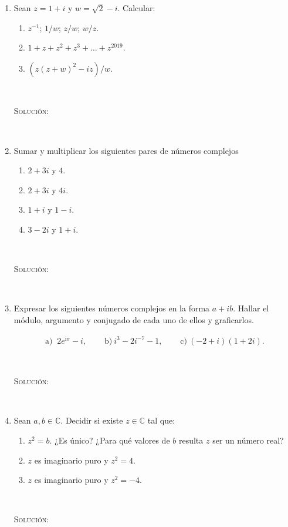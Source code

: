\documentclass[a4paper,12pt,twoside,spanish,reqno]{amsbook}
\numberwithin{equation}{section}
\newcommand{\rta}{\noindent\textsc{Solución: }}
\begin{document}
\begin{enumerate}
\vspace{.5cm}


\item Sean $z=1+i$ y $w=\sqrt{2}-i$. Calcular:
 \begin{enumerate}
  \item $z^{-1}$; $1/w$; $z/w$; $w/z$.

  \item $1+z+z^2+z^3+\dots+z^{2019}$.

  \item $(z(z+w)^2-iz)/w$.
 \end{enumerate}
	
 \ 

 \rta 
 
 \  

\vspace{.5cm}


\item Sumar y multiplicar los siguientes pares de números complejos
    \begin{enumerate}
        \item $2+ 3i$ y $4$.
        \item $2+ 3i$ y $4i$.
        \item $1 + i$ y $ 1 -i$.
        \item $3-2i$ y $1 +i$. 
    \end{enumerate}

\ 

\rta 

\ 

\vspace{.5cm}


 \item Expresar los siguientes n{ú}meros complejos en la forma $a +i b$.
 Hallar el módulo, argumento y conjugado de cada uno de ellos y graficarlos.

 $$\begin{array}{lll}
 \text{a) }\ 2e^{\mathrm{i}\pi}-i,  \quad & \text{ b)} \  i^3 - 2i^{-7} -1, \quad &\text{ c)}\ (-2+i) (1+2i).
  \end{array}$$
	
  \ 

  \rta 
  
  \ 
    
\vspace{.5cm}

\item Sean $a,b\in\mathbb{C}$. Decidir si existe $z \in \mathbb{C}$ tal que:
\begin{enumerate}
  \item $z^2=b$. ¿Es único? ¿Para qué valores de $b$ resulta $z$ ser un número real?
  \item $z$ es imaginario puro y $z^2=4$.
  \item $z$ es imaginario puro y $z^2=-4$.
\end{enumerate}
	
\ 

\rta 

\ 




\end{enumerate}
\end{document}
